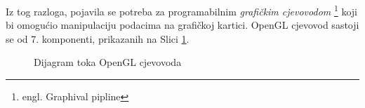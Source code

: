 Iz tog razloga, pojavila se potreba za programabilnim \emph{grafičkim cjevovodom} \footnote{engl. Graphival pipline} koji bi omogućio manipulaciju podacima na grafičkoj kartici. OpenGL cjevovod sastoji se od 7. komponenti\cite{opengl-wiki-pipeline}, prikazanih na Slici \ref{fig:pipeline}.

\begin{figure}[H]
\caption{Dijagram toka OpenGL cjevovoda}
\label{fig:pipeline}
\begin{center}
\end{center}
\end{figure}

